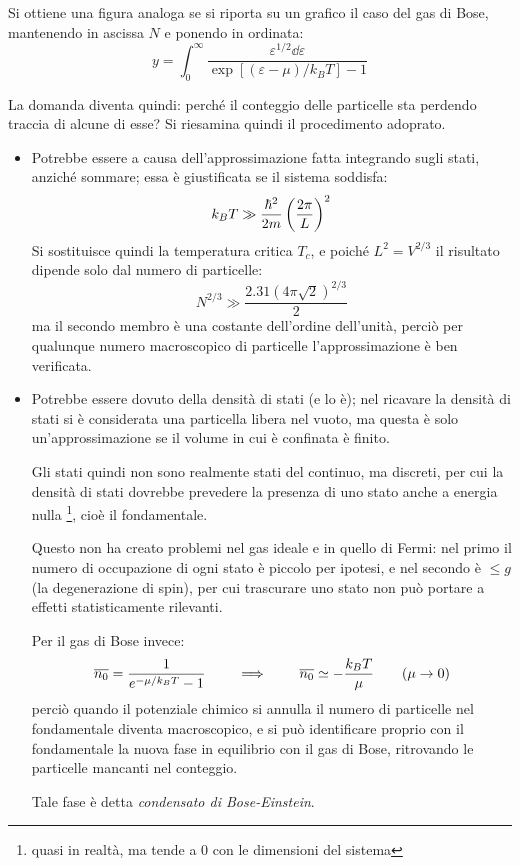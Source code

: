 Si ottiene una figura analoga se si riporta su un grafico il caso del gas di Bose, mantenendo in ascissa $ N $ e ponendo in ordinata:
\begin{equation*}
	y =  \int_{0}^{\infty}  \frac{\varepsilon^{1/2} \dd \varepsilon}{ \exp\left[(\varepsilon - \mu)/k_B T\right] - 1}
\end{equation*}

La domanda diventa quindi: perché il conteggio delle particelle sta perdendo traccia di alcune di esse? Si riesamina quindi il procedimento adoprato.
\begin{itemize}
	\item Potrebbe essere a causa dell'approssimazione fatta integrando sugli stati, anziché sommare; essa è giustificata se il sistema soddisfa:
	\begin{equation*}
		k_B T \gg \frac{\hbar^2}{2m} \left(\frac{2\pi}{L}\right)^2
	\end{equation*}
	Si sostituisce quindi la temperatura critica $ T_c $, e poiché $L^2 = V^{2/3}$ il risultato dipende solo dal numero di particelle:
	\begin{equation*}
	N^{2/3} \gg \frac{2.31(4\pi\sqrt{2})^{2/3}}{2}
	\end{equation*}
	ma il secondo membro è una costante dell'ordine dell'unità, perciò per qualunque numero macroscopico di particelle l'approssimazione è ben verificata.
	
	\item Potrebbe essere dovuto della densità di stati (e lo è); nel ricavare la densità di stati si è considerata una particella libera nel vuoto, ma questa è solo un'approssimazione se il volume in cui è confinata è finito.
	
	Gli stati quindi non sono realmente stati del continuo, ma discreti, per cui la densità di stati dovrebbe prevedere la presenza di uno stato anche a energia nulla \footnote{quasi in realtà, ma tende a $0$ con le dimensioni del sistema}, cioè il fondamentale. 
	
	Questo non ha creato problemi nel gas ideale e in quello di Fermi: nel primo il numero di occupazione di ogni stato è piccolo per ipotesi, e nel secondo è $\leq g$ (la degenerazione di spin), per cui trascurare uno stato non può portare a effetti statisticamente rilevanti.
	
	Per il gas di Bose invece:
	\begin{equation*}
		\overline{n_0} = \frac{1}{e^{-\mu/k_B T} - 1} \qquad \implies \qquad \overline{n_0} \simeq - \frac{k_B T}{\mu} \qquad (\mu \rightarrow 0)
	\end{equation*}
	perciò quando il potenziale chimico si annulla il numero di particelle nel fondamentale diventa macroscopico, e si può identificare proprio con il fondamentale la nuova fase in equilibrio con il gas di Bose, ritrovando le particelle mancanti nel conteggio.
	
	Tale fase è detta \textit{condensato di Bose-Einstein}.
\end{itemize}

